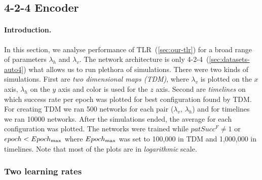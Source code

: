 

\subsection{4-2-4 Encoder} 
\label{sec:results-auto4} 

\paragraph{Introduction.} 
\label{sec:results-auto4-introduction} 
In this section, we analyse performance of TLR~(\ref{sec:our-tlr}) for a broad range of parameters $\lambda_h$ and $\lambda_v$. The network architecture is only 4-2-4~(\ref{sec:datasets-auto4}) what allows us to run plethora of simulations. There were two kinds of simulations. First are \emph{two dimensional maps (TDM)}, where $\lambda_v$ is plotted on the $x$ axis, $\lambda_h$ on the $y$ axis and color is used for the $z$ axis. Second are \emph{timelines}  on which success rate per epoch was plotted for best configuration found by TDM. For creating TDM we ran 500 networks for each pair ($\lambda_v$, $\lambda_h$) and for timelines we ran 10000 networks. After the simulations ended, the average for each configuration was plotted. The networks were trained while $patSucc^F \neq 1$ or $epoch < Epoch_{\rm max}$ where $Epoch_{\rm max}$ was set to 100,000 in TDM and 1,000,000 in timelines. Note that most of the plots are in \emph{logarithmic} scale. 

 

\subsubsection{Two learning rates} 
\label{sec:tlr-auto4}

